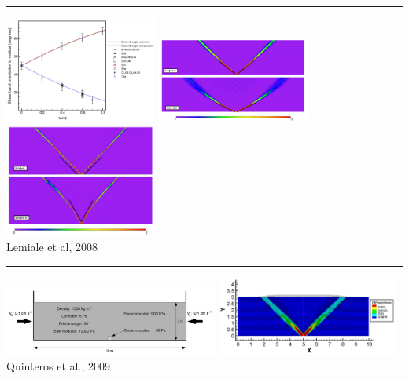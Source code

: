 \begin{center}\noindent\rule{8cm}{0.4pt}\end{center}

\begin{center}
\includegraphics[width=5cm]{images/benchmark_brick/lemm08a}
\includegraphics[width=5cm]{images/benchmark_brick/lemm08b}
\includegraphics[width=5cm]{images/benchmark_brick/lemm08c}\\
{\small Lemiale et al, 2008 \cite{lemm08}}
\end{center}

\begin{center}\noindent\rule{8cm}{0.4pt}\end{center}

\begin{center}
\includegraphics[width=7cm]{images/benchmark_brick/qurj09b}
\includegraphics[width=6cm]{images/benchmark_brick/qurj09a}\\
{\small Quinteros et al., 2009 \cite{qurj09}}
\end{center}

